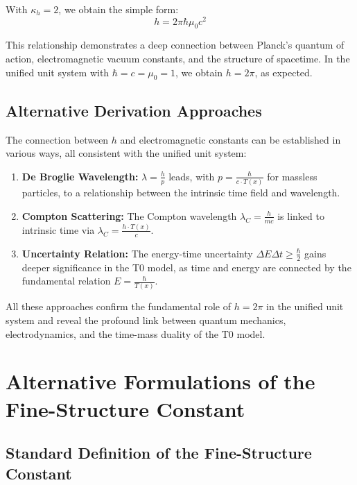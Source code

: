 \documentclass[12pt,a4paper]{article}
\newcommand{\Tfield}{T(x)}
\begin{document}
	With \(\kappa_h = 2\), we obtain the simple form:
	\begin{equation}
		h = 2\pi\hbar \mu_0 c^2
	\end{equation}
	
	This relationship demonstrates a deep connection between Planck's quantum of action, electromagnetic vacuum constants, and the structure of spacetime. In the unified unit system with \(\hbar = c = \mu_0 = 1\), we obtain \(h = 2\pi\), as expected.
	
	\subsection{Alternative Derivation Approaches}
	
	The connection between \(h\) and electromagnetic constants can be established in various ways, all consistent with the unified unit system:
	
	\begin{enumerate}
		\item \textbf{De Broglie Wavelength:} \(\lambda = \frac{h}{p}\) leads, with \(p = \frac{\hbar}{c \cdot \Tfield}\) for massless particles, to a relationship between the intrinsic time field and wavelength.
		\item \textbf{Compton Scattering:} The Compton wavelength \(\lambda_C = \frac{h}{mc}\) is linked to intrinsic time via \(\lambda_C = \frac{h \cdot \Tfield}{c}\).
		\item \textbf{Uncertainty Relation:} The energy-time uncertainty \(\Delta E \Delta t \geq \frac{\hbar}{2}\) gains deeper significance in the T0 model, as time and energy are connected by the fundamental relation \(E = \frac{\hbar}{\Tfield}\).
	\end{enumerate}
	
	All these approaches confirm the fundamental role of \(h = 2\pi\) in the unified unit system and reveal the profound link between quantum mechanics, electrodynamics, and the time-mass duality of the T0 model.
	
	\section{Alternative Formulations of the Fine-Structure Constant}
	
	\subsection{Standard Definition of the Fine-Structure Constant}
	
\end{document}
